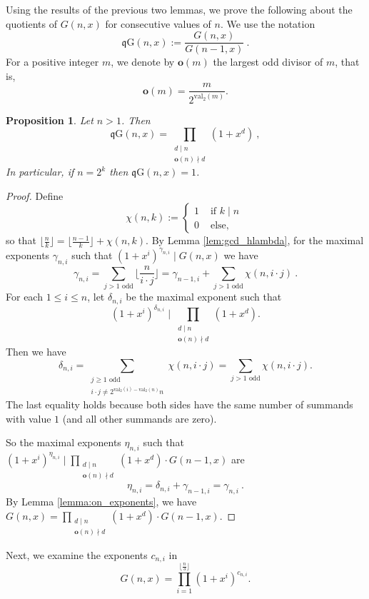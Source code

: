 \documentclass[reqno]{amsart}
\def\G{G}
\def\e{\gamma}
\def\val{\mathrm{val}}
\def\rg{\mathrm{\mathfrak q G}}
\def\o{\mathbf o}
\newtheorem{proposition}[theorem]{Proposition}
\theoremstyle{definition}
\begin{document}
Using the results of the previous two lemmas, we prove the following about the quotients of  $\G(n,x)$ for consecutive values of $n$. We use the notation \[\rg(n,x) := \frac{\G(n,x)}{\G(n-1,x)}\:.\] For a positive integer $m$, we denote by $\o(m)$ the largest odd divisor of $m$, that is, $$\o(m)=\frac{m}{2^{\val_2(m)}}.$$

\begin{proposition}\label{G:recursion}
 Let $n>1$. Then \[\rg(n,x) = \prod_{\substack{d \mid n\\ \o(n)\nmid d}} (1+x^d)\:,\] In particular, if $n=2^k$ then $\rg(n,x)=1 $. 
\end{proposition}
\begin{proof} 
    Define
    \[\chi(n,k):=\begin{cases}1&\textrm{ if } k\mid n\\0&\textrm{ else, }\end{cases}\:\]
    so that $\lfloor\frac{n}{k}\rfloor=\lfloor\frac{n-1}{k}\rfloor+\chi(n,k)$.
    By Lemma \ref{lem:gcd_hlambda}, for the maximal exponents $\e_{n,i}$ such that $(1+x^i)^{\e_{n,i}}\mid \G(n,x)$ we have
    \[\e_{n,i}=\sum_{j>1 \textrm{ odd}}\lfloor\frac{n}{i\cdot j}\rfloor=\e_{n-1,i}+\sum_{j>1 \textrm{ odd}}\chi(n,i\cdot j)\:.\]
    For each $1\leq i\leq n$, let $\delta_{n,i}$ be the maximal exponent such that $$(1+x^i)^{\delta_{n,i}}\mid \prod_{\substack{d \mid n\\ \o(n)\nmid d}} (1+x^d).$$
     Then  we have 
    \[\delta_{n,i}=\sum_{\substack{j\geq 1 \textrm{ odd }\\ i\cdot j\neq 2^{\val_2(i)-\val_2(n)}n}}\chi(n,i\cdot j)=\sum_{j>1 \textrm{ odd}}\chi(n,i\cdot j).\]
    The last equality holds because both sides have the same number of summands with value $1$ (and all other summands are zero). 



    So the maximal exponents $\eta_{ n,i}$ such that $(1+x^i)^{\eta_{n,i}}\mid \prod_{\substack{d \mid n\\ \o(n)\nmid d}} (1+x^d)\cdot\G(n-1,x)$ are
    \[\eta_{n,i}=\delta_{n,i}+\e_{n-1,i}=\e_{n,i}\:.\]
   By Lemma \ref{lemma:on_exponents}, we have $\G(n,x)=\prod_{\substack{d \mid n\\ \o(n)\nmid d}} (1+x^d)\cdot\G(n-1,x)$.
\end{proof}



Next, we examine the exponents $c_{n,i}$ in
$$\G(n,x)=\prod_{i = 1}^{\lfloor \frac{n}{3}\rfloor}(1+x^i)^{c_{n,i}}.$$ 
\end{document}
